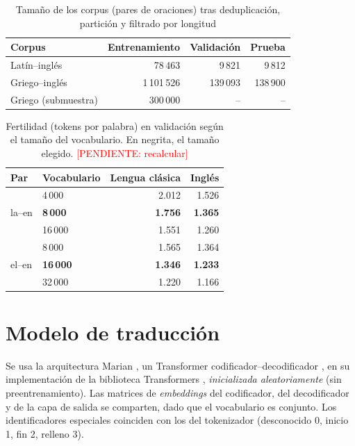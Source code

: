 \documentclass[conference]{IEEEtran}
\newcommand{\pendiente}[1]{\textcolor{red}{[PENDIENTE: #1]}}
\begin{document}
\begin{table}[t]
\centering
\caption{Tamaño de los corpus (pares de oraciones) tras deduplicación,
partición y filtrado por longitud}
\label{tab:corpus}
\begin{tabular}{lrrr}
\toprule
Corpus & Entrenamiento & Validación & Prueba \\
\midrule
Latín--inglés  & 78\,463 & 9\,821 & 9\,812 \\
Griego--inglés & 1\,101\,526 & 139\,093 & 138\,900 \\
\midrule
Griego (submuestra) & 300\,000 & -- & -- \\
\bottomrule
\end{tabular}
\end{table}

\begin{table}[t]
\centering
\caption{Fertilidad (tokens por palabra) en validación según el tamaño
del vocabulario. En negrita, el tamaño elegido. \pendiente{recalcular}}
\label{tab:tokenizadores}
\begin{tabular}{llrr}
\toprule
Par & Vocabulario & Lengua clásica & Inglés \\
\midrule
\multirow{3}{*}{la--en} & 4\,000  & 2.012 & 1.526 \\
                        & \textbf{8\,000}  & \textbf{1.756} & \textbf{1.365} \\
                        & 16\,000 & 1.551 & 1.260 \\
\midrule
\multirow{3}{*}{el--en} & 8\,000  & 1.565 & 1.364 \\
                        & \textbf{16\,000} & \textbf{1.346} & \textbf{1.233} \\
                        & 32\,000 & 1.220 & 1.166 \\
\bottomrule
\end{tabular}
\end{table}

\section{Modelo de traducción}

Se usa la arquitectura Marian \cite{junczys2018marian}, un Transformer
codificador--decodificador \cite{vaswani2017attention}, en su
implementación de la biblioteca Transformers \cite{wolf2020transformers},
\emph{inicializada aleatoriamente} (sin preentrenamiento). Las matrices de
\emph{embeddings} del codificador, del decodificador y de la capa de
salida se comparten, dado que el vocabulario es conjunto. Los
identificadores especiales coinciden con los del tokenizador
(desconocido 0, inicio 1, fin 2, relleno 3).
\end{document}

